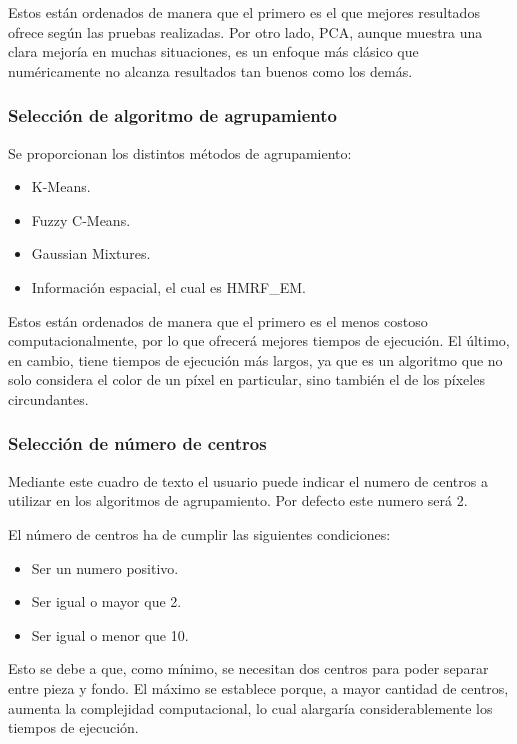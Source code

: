 Estos están ordenados de manera que el primero es el que mejores resultados ofrece según las pruebas realizadas. Por otro lado, PCA, aunque muestra una clara mejoría en muchas situaciones, es un enfoque más clásico que numéricamente no alcanza resultados tan buenos como los demás.

\subsubsection{Selección de algoritmo de agrupamiento}\label{selección-de-algoritmo-de-agrupamiento}

Se proporcionan los distintos métodos de agrupamiento:

\begin{itemize}
    \item K-Means.
    \item Fuzzy C-Means.
    \item Gaussian Mixtures.
    \item Información espacial, el cual es HMRF\_EM.
\end{itemize}

Estos están ordenados de manera que el primero es el menos costoso computacionalmente, por lo que ofrecerá mejores tiempos de ejecución. El último, en cambio, tiene tiempos de ejecución más largos, ya que es un algoritmo que no solo considera el color de un píxel en particular, sino también el de los píxeles circundantes.

\subsubsection{Selección de número de centros}\label{selección-de-número-de-centros}

Mediante este cuadro de texto el usuario puede indicar el numero de centros a utilizar en los algoritmos de agrupamiento. Por defecto este numero será 2.

El número de centros ha de cumplir las siguientes condiciones:

\begin{itemize}
    \item Ser un numero positivo.
    \item Ser igual o mayor que 2.
    \item Ser igual o menor que 10.
\end{itemize}

Esto se debe a que, como mínimo, se necesitan dos centros para poder separar entre pieza y fondo. El máximo se establece porque, a mayor cantidad de centros, aumenta la complejidad computacional, lo cual alargaría considerablemente los tiempos de ejecución.

